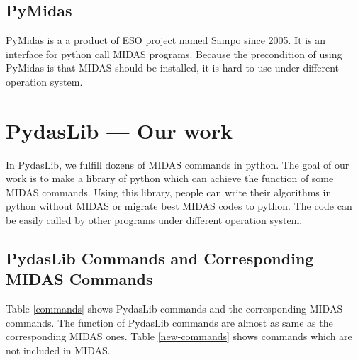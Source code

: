           \subsection{PyMidas}
PyMidas is a a product of ESO project named Sampo since 2005. It is 
an interface for python call MIDAS programs. Because the precondition of 
using PyMidas is that MIDAS should be installed, it is hard to use under
different operation system.

          \section{PydasLib --- Our work}
In PydasLib, we fulfill dozens of MIDAS commands in python. 
The goal of our work is to make a library of python which 
can achieve the function of some MIDAS commands. Using this library, people 
can write their algorithms in python without MIDAS or migrate best MIDAS
codes to python. The code can be easily 
called by other programs under different operation system. 

	  \subsection{PydasLib Commands and Corresponding MIDAS Commands}
Table \ref{commands} shows PydasLib commands and the corresponding MIDAS commands.
The function of PydasLib commands are almost as same as the corresponding MIDAS ones.
Table \ref{new-commands} shows commands which are not included in MIDAS. 

